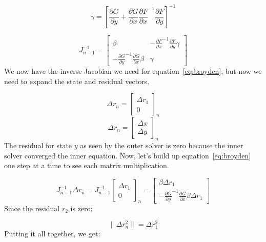 \documentclass{article}
\begin{document}
\begin{equation}
  \gamma = \left[ \frac{\partial G}{\partial y} + \frac{\partial G}{\partial x} {\frac{\partial F}{\partial x}}^{-1} \frac{\partial F}{\partial y} \right]^{-1}
\end{equation}

\begin{equation}
  J_{n-1}^{-1}   =
  \begin{bmatrix}
    \beta &
    - {\frac{\partial F}{\partial x}}^{-1} \frac{\partial F}{\partial y} \gamma \\
    - {\frac{\partial G}{\partial y}}^{-1} \frac{\partial G}{\partial x} \beta &
    \gamma
  \end{bmatrix}
\end{equation}
We now have the inverse Jacobian we need for equation~\eqref{eq:broyden}, but now we need to expand the state and residual vectors.

\begin{equation}
  \Delta r_n = {
  \begin{bmatrix}
    \Delta r_1 \\
    0
  \end{bmatrix}
  }_n
\end{equation}
\begin{equation}
  \Delta r_n = {
  \begin{bmatrix}
    \Delta x \\
    \Delta y
  \end{bmatrix}
  }_n
\end{equation}
The residual for state $y$ as seen by the outer solver is zero because the inner solver converged the inner equation. Now, let's build up
equation~\eqref{eq:broyden} one step at a time to see each matrix multiplication.

\begin{equation}
  J_{n-1}^{-1} \Delta r_n = J_{n-1}^{-1} {
  \begin{bmatrix}
    \Delta r_1 \\
    0
  \end{bmatrix}
  }_n =
  \begin{bmatrix}
    \beta \Delta r_1 \\
    - {\frac{\partial G}{\partial y}}^{-1} \frac{\partial G}{\partial x} \beta \Delta r_1
  \end{bmatrix}
\end{equation}
Since the residual $r_2$ is zero:

\begin{equation}
  \| \Delta r_{n}^2 \| = \Delta r_{1}^2
\end{equation}
Putting it all together, we get:
\end{document}
